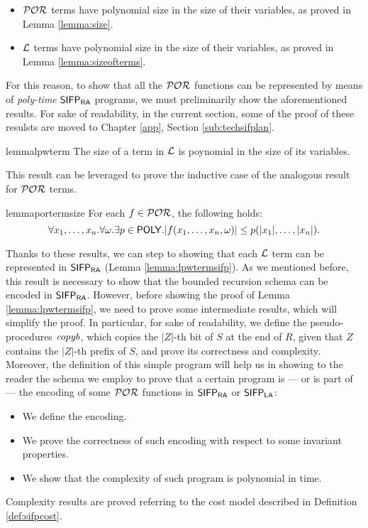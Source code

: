 \begin{itemize}
  \item $\mathcal{POR}$ terms have polynomial size in the size of their variables,
  as proved in Lemma \ref{lemma:size}.
  \item $\mathcal{L}$ terms have polynomial size in the size of their variables,
  as proved in Lemma \ref{lemma:sizeofterms}.
\end{itemize}

For this reason, to show that all the $\mathcal{POR}$
functions can be represented by means of \emph{poly-time} $\mathsf{SIFP_{{\mathsf{RA}}}}$ programs,
we must preliminarily show the aforementioned results. For sake of readability,
in the current section, some of the proof of these resulsts are moved to
Chapter \ref{app}, Section \ref{sub:techsifplan}.

\begin{restatable}{lemma}{lpwterm}\label{lemma:size}
The size of a term in $\mathcal{L}$ is poynomial in the size
of its variables.
\end{restatable}
\noindent
This result can be leveraged to prove the inductive case of the analogous
result for $\mathcal{POR}$ terms.

\begin{restatable}{lemma}{portermsize}\label{lemma:sizeofterms}
For each $f\in \mathcal{POR}$, the following holds:
$$
\forall x_1,\dots,x_n.\forall \omega.\exists p\in \mathsf{POLY}.
|f(x_1,\dots, x_n,\omega)| \leq p(|x_1|,\dots, |x_n|).
$$
\end{restatable}

Thanks to these results,
we can step to showing that each $\mathcal{L}$ term can be represented in $\mathsf{SIFP_{{\mathsf{RA}}}}$
(Lemma \ref{lemma:lpwtermsifp}).
As we mentioned before, this result is necessary to show that
the bounded recursion schema can be encoded in $\mathsf{SIFP_{{\mathsf{RA}}}}$. However,
before showing the proof of Lemma \ref{lemma:lpwtermsifp}, we need to prove some
intermediate results, which will simplify the proof. In particular,
for sake of readability, we define the pseudo-procedures $\mathit{copyb}$, which copies
the $|Z|$-th bit of $S$ at the end of $R$,
given that $Z$ contains the $|Z|$-th prefix of $S$, and prove its correctness
and complexity.
%
Moreover, the definition of this simple program will help us in showing
to the reader the schema we employ to prove that a certain program is
--- or is part of --- the encoding of some $\mathcal{POR}$ functions in
$\mathsf{SIFP_{{\mathsf{RA}}}}$ or $\mathsf{SIFP_{{\mathsf{LA}}}}$:

\begin{itemize}
  \item We define the encoding.
  \item We prove the correctness of such encoding with respect to some invariant
  properties.
  \item We show that the complexity of such program is polynomial in time.
  \end{itemize}
\noindent
Complexity results are proved referring to the cost model described
in Definition \ref{def:sifpcost}.

